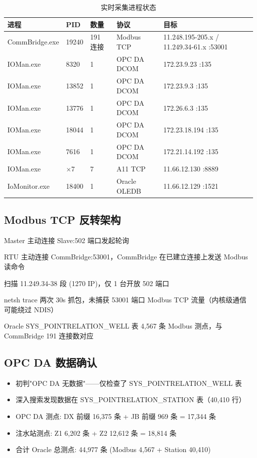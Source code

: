 \documentclass[12pt,a4paper]{ctexart}
\begin{document}
\begin{table}[H]\centering
\caption{实时采集进程状态}
\begin{tabular}{p{2.5cm}p{2.5cm}p{2.5cm}p{3cm}p{3.5cm}}
\toprule
\textbf{进程} & \textbf{PID} & \textbf{数量} & \textbf{协议} & \textbf{目标} \\
\midrule
CommBridge.exe & 19240 & 191 连接 & Modbus TCP & 11.248.195-205.x / 11.249.34-61.x :53001 \\
IOMan.exe & 8320 & 1 & OPC DA DCOM & 172.23.9.23 :135 \\
IOMan.exe & 13852 & 1 & OPC DA DCOM & 172.23.9.3 :135 \\
IOMan.exe & 13776 & 1 & OPC DA DCOM & 172.26.6.3 :135 \\
IOMan.exe & 18044 & 1 & OPC DA DCOM & 172.23.18.194 :135 \\
IOMan.exe & 7616 & 1 & OPC DA DCOM & 172.21.14.192 :135 \\
IOMan.exe & $\times$7 & 7 & A11 TCP & 11.66.12.130 :8889 \\
IoMonitor.exe & 18400 & 1 & Oracle OLEDB & 11.66.12.129 :1521 \\
\bottomrule
\end{tabular}
\end{table}

\subsection{Modbus TCP 反转架构}

\begin{description}[leftmargin=*]
  \item[标准架构] Master 主动连接 Slave:502 端口发起轮询
  \item[实际架构] RTU 主动连接 CommBridge:53001，CommBridge 在已建立连接上发送 Modbus 读命令
  \item[端口验证] 扫描 11.249.34-38 段 (1270 IP)，仅 1 台开放 502 端口
  \item[抓包验证] netsh trace 两次 30s 抓包，未捕获 53001 端口 Modbus TCP 流量（内核级通信可能绕过 NDIS）
  \item[数据验证] Oracle SYS\_POINTRELATION\_WELL 表 4,567 条 Modbus 测点，与 CommBridge 191 连接数对应
\end{description}

\subsection{OPC DA 数据确认}

\begin{itemize}[leftmargin=*]
  \item 初判"OPC DA 无数据"——仅检查了 SYS\_POINTRELATION\_WELL 表
  \item 深入搜索发现数据在 SYS\_POINTRELATION\_STATION 表（40,410 行）
  \item OPC DA 测点: DX 前缀 16,375 条 + JB 前缀 969 条 = 17,344 条
  \item 注水站测点: Z1 6,202 条 + Z2 12,612 条 = 18,814 条
  \item 合计 Oracle 总测点: 44,977 条 (Modbus 4,567 + Station 40,410)
\end{itemize}
\end{document}
